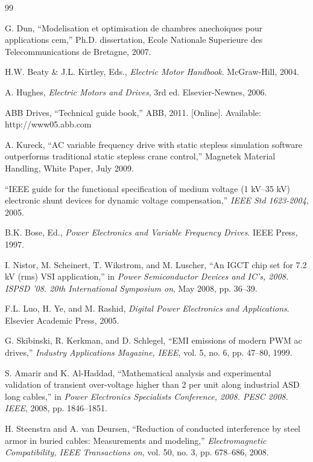 \begin{thebibliography}{99}

G. Dun, ``Modelisation et optimisation de chambres anechoiques pour applications cem,'' Ph.D. dissertation, Ecole Nationale Superieure des Telecommunications de Bretagne, 2007.

H.W. Beaty \& J.L. Kirtley, Eds., \textit{Electric Motor Handbook}. McGraw-Hill, 2004.

A. Hughes, \textit{Electric Motors and Drives}, 3rd ed. Elsevier-Newnes, 2006.

ABB Drives, ``Technical guide book,'' ABB, 2011. [Online]. Available: http://www05.abb.com

A. Kureck, ``AC variable frequency drive with static stepless simulation software outperforms traditional static stepless crane control,'' Magnetek Material Handling, White Paper, July 2009.

``IEEE guide for the functional specification of medium voltage (1 kV--35 kV) electronic shunt devices for dynamic voltage compensation,'' \textit{IEEE Std 1623-2004}, 2005.

B.K. Bose, Ed., \textit{Power Electronics and Variable Frequency Drives}. IEEE Press, 1997.

I. Nistor, M. Scheinert, T. Wikstrom, and M. Luscher, ``An IGCT chip set for 7.2 kV (rms) VSI application,'' in \textit{Power Semiconductor Devices and IC's, 2008. ISPSD '08. 20th International Symposium on}, May 2008, pp. 36--39.

F.L. Luo, H. Ye, and M. Rashid, \textit{Digital Power Electronics and Applications}. Elsevier Academic Press, 2005.

G. Skibinski, R. Kerkman, and D. Schlegel, ``EMI emissions of modern PWM ac drives,'' \textit{Industry Applications Magazine, IEEE}, vol. 5, no. 6, pp. 47--80, 1999.

S. Amarir and K. Al-Haddad, ``Mathematical analysis and experimental validation of transient over-voltage higher than 2 per unit along industrial ASD long cables,'' in \textit{Power Electronics Specialists Conference, 2008. PESC 2008. IEEE}, 2008, pp. 1846--1851.

H. Steenstra and A. van Deursen, ``Reduction of conducted interference by steel armor in buried cables: Measurements and modeling,'' \textit{Electromagnetic Compatibility, IEEE Transactions on}, vol. 50, no. 3, pp. 678--686, 2008.


\end{thebibliography}
